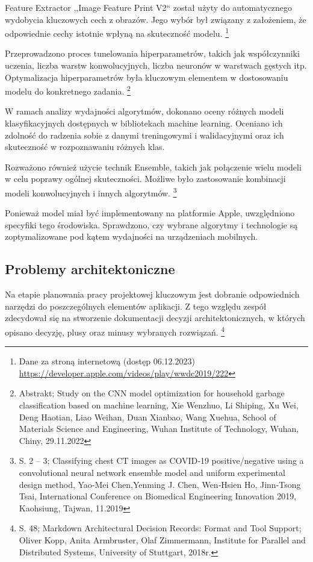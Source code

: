 \documentclass[12pt, a4paper, twoside, openany]{book}
\newcommand{\forceindent}{\leavevmode{\parindent=1.3em\indent}}
\begin{document}
{%
Feature Extractor ,,Image Feature Print V2`` został użyty do automatycznego wydobycia kluczowych cech z obrazów.
Jego wybór był związany z założeniem, że odpowiednie cechy istotnie wpłyną na skuteczność modelu. \footnote{Dane za stroną internetową (dostęp 06.12.2023) \url{https://developer.apple.com/videos/play/wwdc2019/222}}

Przeprowadzono proces tunelowania hiperparametrów, takich jak współczynniki uczenia, liczba warstw konwolucyjnych, liczba neuronów w warstwach gęstych itp.
Optymalizacja hiperparametrów była kluczowym elementem w dostosowaniu modelu do konkretnego zadania. \footnote{Abstrakt; Study on the CNN model optimization for household garbage classification based on machine learning, Xie Wenzhuo, Li Shiping, Xu Wei, Deng Haotian, Liao Weihan, Duan Xianbao, Wang Xuehua, School of Materials Science and Engineering, Wuhan Institute of Technology, Wuhan, Chiny, 29.11.2022 }

W ramach analizy wydajności algorytmów, dokonano oceny różnych modeli klasyfikacyjnych dostępnych w bibliotekach machine learning.
Oceniano ich zdolność do radzenia sobie z danymi treningowymi i walidacyjnymi oraz ich skuteczność w rozpoznawaniu różnych klas.

Rozważono również użycie technik Ensemble, takich jak połączenie wielu modeli w celu poprawy ogólnej skuteczności.
Możliwe było zastosowanie kombinacji modeli konwolucyjnych i innych algorytmów. \footnote{ S. 2 -- 3; Classifying chest CT images as COVID‑19 positive/negative using a convolutional neural network ensemble model and uniform experimental design method, Yao‑Mei Chen,Yenming J. Chen, Wen‑Hsien Ho, Jinn‑Tsong Tsai, International Conference on Biomedical Engineering Innovation 2019, Kaohsiung, Tajwan, 11.2019}

Ponieważ model miał być implementowany na platformie Apple, uwzględniono specyfiki tego środowiska.
Sprawdzono, czy wybrane algorytmy i technologie są zoptymalizowane pod kątem wydajności na urządzeniach
mobilnych.

\subsection{Problemy architektoniczne}

\forceindent Na etapie planowania pracy projektowej kluczowym jest dobranie odpowiednich narzędzi
do poszczególnych elementów aplikacji. Z tego względu zespół zdecydował się na stworzenie
dokumentacji decyzji architektonicznych, w których opisano decyzję, plusy oraz minusy wybranych rozwiązań. \footnote{S. 48; Markdown Architectural Decision Records: Format and Tool Support; Oliver Kopp, Anita Armbruster, Olaf Zimmermann, Institute for Parallel and Distributed Systems, University of Stuttgart, 2018r.}

}
\end{document}
